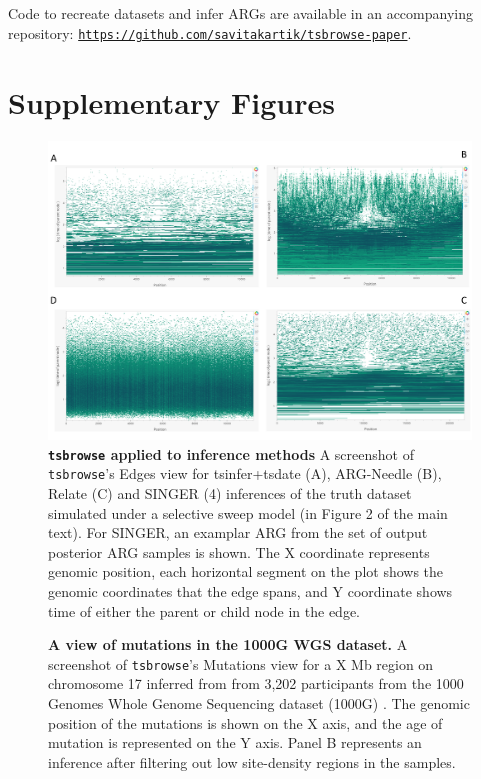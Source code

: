 \documentclass[unnumsec,webpdf,contemporary,large,namedate]{oup-authoring-template}%
\begin{document}
\subsection{} Code to recreate datasets and infer ARGs are available in an
accompanying repository:
\texttt{\url{https://github.com/savitakartik/tsbrowse-paper}}.

\clearpage
\section{Supplementary Figures}
\begin{figure}
    \centering
    \includegraphics[width=0.95\linewidth]{figures/SuppFig1.png}
    \caption{\textbf{\texttt{tsbrowse} applied to inference methods}
    A screenshot of \texttt{tsbrowse}'s Edges view for tsinfer+tsdate (A),
ARG-Needle (B), Relate (C) and SINGER (4) inferences of the truth dataset
simulated under a selective sweep model (in Figure 2 of the main text). For
SINGER, an examplar ARG from the set of output posterior ARG samples is shown.
The X coordinate represents genomic position, each horizontal segment on the
plot shows the genomic coordinates that the edge spans, and Y coordinate shows
time of either the parent or child node in the edge.}
    \label{fig:Supplementary_Figure_1}
\end{figure}

\begin{figure}
    \centering
    \caption{\textbf{A view of mutations in the 1000G WGS dataset.} A
screenshot of \texttt{tsbrowse}'s Mutations view for a X Mb region on
chromosome 17 inferred from from 3,202 participants from the 1000 Genomes Whole
Genome Sequencing dataset (1000G) \citep{1000G2015, 1000GWGS}. The genomic
position of the mutations is shown on the X axis, and the age of mutation is
represented on the Y axis. Panel B represents an inference after filtering out
low site-density regions in the samples.}
    \label{fig:Supplementary_Figure_2}
\end{figure}
\end{document}
